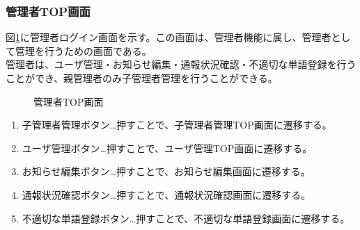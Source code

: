 \documentclass[a4j]{jarticle}
\begin{document}
  \renewcommand{\labelenumi}{\textcircled{\scriptsize \theenumi}}


\subsubsection{管理者TOP画面}
図\ref{fig:admin_top}に管理者ログイン画面を示す。この画面は、管理者機能に属し、管理者として管理を行うための画面である。\\
管理者は、ユーザ管理・お知らせ編集・通報状況確認・不適切な単語登録を行うことができ、親管理者のみ子管理者管理を行うことができる。

\begin{figure}[H]
\centering
{}
\caption{管理者TOP画面}
\label{fig:admin_top}
\end{figure}
\begin{enumerate}
  \renewcommand{\labelenumi}{\textcircled{\scriptsize \theenumi}}

\item 子管理者管理ボタン…押すことで、子管理者管理TOP画面に遷移する。

\item ユーザ管理ボタン…押すことで、ユーザ管理TOP画面に遷移する。

\item お知らせ編集ボタン…押すことで、お知らせ編集画面に遷移する。

\item 通報状況確認ボタン…押すことで、通報状況確認画面に遷移する。

\item 不適切な単語登録ボタン…押すことで、不適切な単語登録画面に遷移する。
\end{enumerate}
\end{document}
